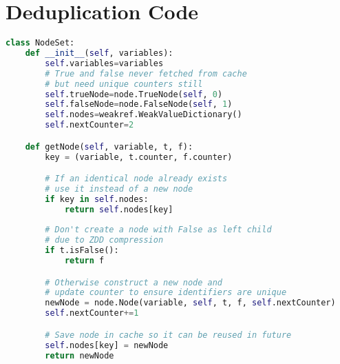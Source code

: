 \documentclass[12pt,a4paper,twoside,openright]{report}
\begin{document}
\chapter{Deduplication Code}
\begin{lstlisting}[language=Python]
class NodeSet:
    def __init__(self, variables):
        self.variables=variables
        # True and false never fetched from cache
        # but need unique counters still
        self.trueNode=node.TrueNode(self, 0)
        self.falseNode=node.FalseNode(self, 1)
        self.nodes=weakref.WeakValueDictionary()
        self.nextCounter=2

    def getNode(self, variable, t, f):
        key = (variable, t.counter, f.counter)

        # If an identical node already exists
        # use it instead of a new node
        if key in self.nodes:
            return self.nodes[key]
        
        # Don't create a node with False as left child
        # due to ZDD compression
        if t.isFalse():
            return f

        # Otherwise construct a new node and
        # update counter to ensure identifiers are unique
        newNode = node.Node(variable, self, t, f, self.nextCounter)
        self.nextCounter+=1

        # Save node in cache so it can be reused in future
        self.nodes[key] = newNode
        return newNode
\end{lstlisting}
\end{document}
